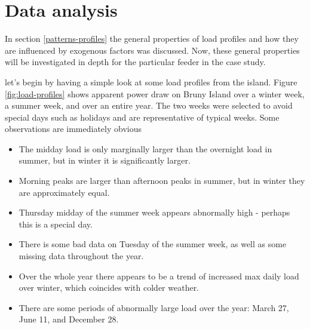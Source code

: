 \section{Data analysis}
In section \ref{patterns-profiles} the general properties of load profiles and how they are influenced by exogenous factors was discussed. Now, these general properties will be investigated in depth for the particular feeder in the case study.
\par
let's begin by having a simple look at some load profiles from the island.
Figure \ref{fig:load-profiles} shows apparent power draw on Bruny Island over a winter week, a summer week, and over an entire year.
The two weeks were selected to avoid special days such as holidays and are representative of typical weeks.
Some observations are immediately obvious
\begin{itemize}
	\item The midday load is only marginally larger than the overnight load in summer, but in winter it is significantly larger.
	\item Morning peaks are larger than afternoon peaks in summer, but in winter they are approximately equal.
	\item Thursday midday of the summer week appears abnormally high - perhaps this is a special day.
	\item There is some bad data on Tuesday of the summer week, as well as some missing data throughout the year.
	\item Over the whole year there appears to be a trend of increased max daily load over winter, which coincides with colder weather.
	\item There are some periods of abnormally large load over the year: March 27, June 11, and December 28.
\end{itemize}

